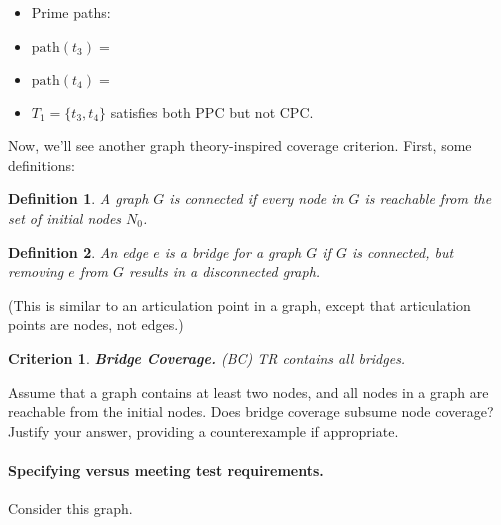 \documentclass[11pt]{article}
\newtheorem{defn}{Definition}
\newtheorem{crit}{Criterion}
\begin{document}
\begin{itemize}
\item {\sf Prime paths: }
\item $\mbox{path}(t_3) = $ 
\item $\mbox{path}(t_4) = $ 
\item $T_1 = \{ t_3, t_4 \}$ satisfies both PPC but not CPC.
\end{itemize}

Now, we'll see another graph theory-inspired coverage criterion. First, some definitions:
\begin{defn}
  A graph $G$ is \emph{connected} if every node in $G$ is reachable from the
  set of initial nodes $N_0$.
\end{defn}
\begin{defn}
  An edge $e$ is a \emph{bridge} for a graph $G$ if $G$ is connected,
  but removing $e$ from $G$ results in a disconnected graph.
\end{defn}
(This is similar to an articulation point in a graph, except that
articulation points are nodes, not edges.)

\begin{crit}
  {\bf Bridge Coverage.} (BC) \emph{TR} contains all bridges.
\end{crit}
Assume that a graph contains at least two nodes, and all nodes
in a graph are reachable from the initial nodes. Does bridge
coverage subsume node coverage? Justify your answer, providing
a counterexample if appropriate.

\paragraph{Specifying versus meeting test requirements.}
Consider this graph.

\begin{center}
\end{center}
\end{document}
